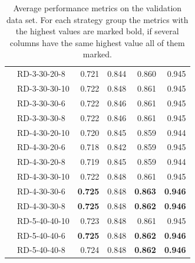 \begin{table}[ht]
\begin{tabular}{llrrrr}
                                 & RD-3-30-20-8   & 0.721          & 0.844          & 0.860          & 0.945          \\
                                 & RD-3-30-30-10  & 0.722          & 0.848          & 0.861          & 0.945          \\
                                 & RD-3-30-30-6   & 0.722          & 0.846          & 0.861          & 0.945          \\
                                 & RD-3-30-30-8   & 0.722          & 0.846          & 0.861          & 0.945          \\
                                 & RD-4-30-20-10  & 0.720          & 0.845          & 0.859          & 0.944          \\
                                 & RD-4-30-20-6   & 0.718          & 0.842          & 0.859          & 0.945          \\
                                 & RD-4-30-20-8   & 0.719          & 0.845          & 0.859          & 0.944          \\
                                 & RD-4-30-30-10  & 0.722          & 0.848          & 0.861          & 0.945          \\
                                 & RD-4-30-30-6   & \textbf{0.725} & 0.848          & \textbf{0.863} & \textbf{0.946} \\
                                 & RD-4-30-30-8   & \textbf{0.725} & 0.848          & \textbf{0.862} & \textbf{0.946} \\
                                 & RD-5-40-40-10  & 0.723          & 0.848          & 0.861          & 0.945          \\
                                 & RD-5-40-40-6   & \textbf{0.725} & 0.848          & \textbf{0.862} & \textbf{0.946} \\
                                 & RD-5-40-40-8   & 0.724          & 0.848          & \textbf{0.862} & \textbf{0.946} \\
        \bottomrule
    \end{tabular}
    \caption[Average performance metrics on the validation data set.]{Average performance metrics on the validation data set.
        For each strategy group the metrics with the highest values are marked bold, if several columns have the same highest value
        all of them marked.}
    \label{tab:featurePerformance_validationDataset}
\end{table}

